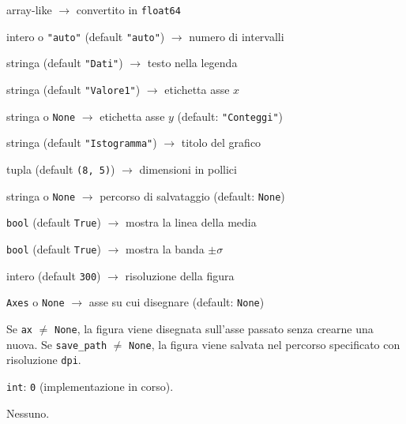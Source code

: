 \begin{apidesc}
  \item[\textbf{Parametri}]\hfill
    \begin{description}[font=\normalfont\ttfamily\bfseries, labelwidth=7em, leftmargin=7.5em, itemsep=1pt, parsep=0pt, topsep=3pt]
      \item[x]          array-like $\to$ convertito in \texttt{float64}
      \item[bins]       intero o \texttt{"auto"} (default \texttt{"auto"}) $\to$ numero di intervalli
      \item[label]      stringa (default \texttt{"Dati"}) $\to$ testo nella legenda
      \item[xlabel]     stringa (default \texttt{"Valore1"}) $\to$ etichetta asse $x$
      \item[ylabel]     stringa o \texttt{None} $\to$ etichetta asse $y$ (default: \texttt{"Conteggi"})
      \item[title]      stringa (default \texttt{"Istogramma"}) $\to$ titolo del grafico
      \item[figsize]    tupla (default \texttt{(8,\,5)}) $\to$ dimensioni in pollici
      \item[save\_path] stringa o \texttt{None} $\to$ percorso di salvataggio (default: \texttt{None})
      \item[show\_mean] \texttt{bool} (default \texttt{True}) $\to$ mostra la linea della media
      \item[show\_std]  \texttt{bool} (default \texttt{True}) $\to$ mostra la banda $\pm\sigma$
      \item[dpi]        intero (default \texttt{300}) $\to$ risoluzione della figura
      \item[ax]         \texttt{Axes} o \texttt{None} $\to$ asse su cui disegnare (default: \texttt{None})
    \end{description}
  \item[\textbf{Vincoli}]
    Se \texttt{ax} $\neq$ \texttt{None}, la figura viene disegnata sull'asse passato senza crearne una nuova.
    Se \texttt{save\_path} $\neq$ \texttt{None}, la figura viene salvata nel percorso specificato con risoluzione \texttt{dpi}.
  \item[\textbf{Restituisce}]
    \texttt{int}: \texttt{0} (implementazione in corso).
  \item[\textbf{Errori}]
    Nessuno.
\end{apidesc}


\newpage
